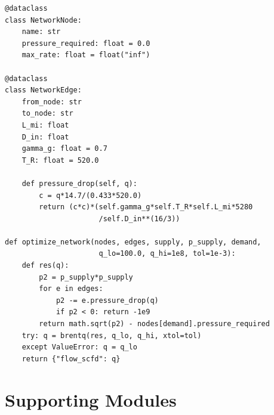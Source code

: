 \documentclass[10pt,a4paper,openany]{book}
\begin{document}
\begin{lstlisting}
@dataclass
class NetworkNode:
    name: str
    pressure_required: float = 0.0
    max_rate: float = float("inf")

@dataclass
class NetworkEdge:
    from_node: str
    to_node: str
    L_mi: float
    D_in: float
    gamma_g: float = 0.7
    T_R: float = 520.0

    def pressure_drop(self, q):
        c = q*14.7/(0.433*520.0)
        return (c*c)*(self.gamma_g*self.T_R*self.L_mi*5280
                      /self.D_in**(16/3))

def optimize_network(nodes, edges, supply, p_supply, demand,
                      q_lo=100.0, q_hi=1e8, tol=1e-3):
    def res(q):
        p2 = p_supply*p_supply
        for e in edges:
            p2 -= e.pressure_drop(q)
            if p2 < 0: return -1e9
        return math.sqrt(p2) - nodes[demand].pressure_required
    try: q = brentq(res, q_lo, q_hi, xtol=tol)
    except ValueError: q = q_lo
    return {"flow_scfd": q}
\end{lstlisting}

\part{Supporting Modules}
\end{document}
